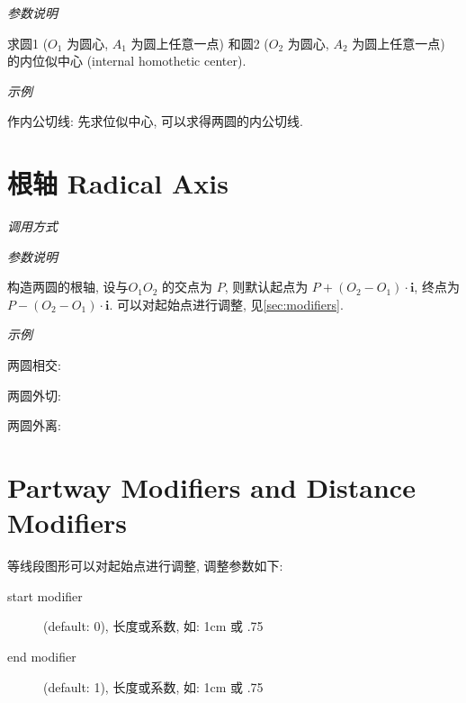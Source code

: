 \emph{参数说明}

求圆1 ($O_1$ 为圆心, $A_1$ 为圆上任意一点)
和圆2 ($O_2$ 为圆心, $A_2$ 为圆上任意一点) 
的内位似中心 (internal homothetic center)\cite{HOMO}.

\emph{示例}

作内公切线: 先求位似中心, 可以求得两圆的内公切线.


\section{根轴 Radical Axis}

\emph{调用方式}

\begin{tcolorbox}{}
\end{tcolorbox}

\emph{参数说明}

构造两圆的根轴, 设与$O_1O_2$ 的交点为 $P$, 则默认起点为 $P+(O_2-O_1) \cdot \mathbf{i}$, 终点为 $P-(O_2-O_1) \cdot \mathbf{i}$.
可以对起始点进行调整, 见\ref{sec:modifiers}.

\emph{示例}

两圆相交:


两圆外切:


两圆外离:


\section{Partway Modifiers and Distance Modifiers}%

等线段图形可以对起始点进行调整, 调整参数如下\cite{CALC}:

\begin{description}
  \item[start modifier] (default: 0), 长度或系数, 如: 1cm 或 .75
  \item[end modifier] (default: 1), 长度或系数, 如: 1cm 或 .75
\end{description}
